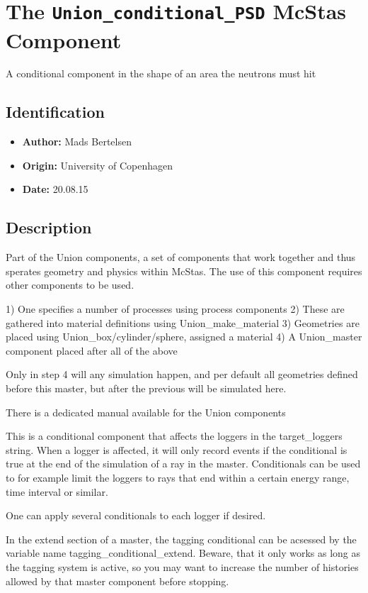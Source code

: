 \section{The \texttt{Union\_conditional\_PSD} McStas Component}
A conditional component in the shape of an area the neutrons must hit

\subsection*{Identification}
\begin{itemize}
  \item \textbf{Author:} Mads Bertelsen
  \item \textbf{Origin:} University of Copenhagen
  \item \textbf{Date:} 20.08.15
\end{itemize}

\subsection*{Description}
Part of the Union components, a set of components that work together and thus sperates geometry and physics within McStas. The use of this component requires other components to be used.

1) One specifies a number of processes using process components 2) These are gathered into material definitions using Union\_make\_material 3) Geometries are placed using Union\_box/cylinder/sphere, assigned a material 4) A Union\_master component placed after all of the above

Only in step 4 will any simulation happen, and per default all geometries defined before this master, but after the previous will be simulated here.

There is a dedicated manual available for the Union components

This is a conditional component that affects the loggers in the target\_loggers string. When a logger is affected, it will only record events if the conditional is true at the end of the simulation of a ray in the master. Conditionals can be used to for example limit the loggers to rays that end within a certain energy range, time interval or similar.

One can apply several conditionals to each logger if desired.

In the extend section of a master, the tagging conditional can be acsessed by the variable name tagging\_conditional\_extend. Beware, that it only works as long as the tagging system is active, so you may want to increase the number of histories allowed by that master component before stopping.


